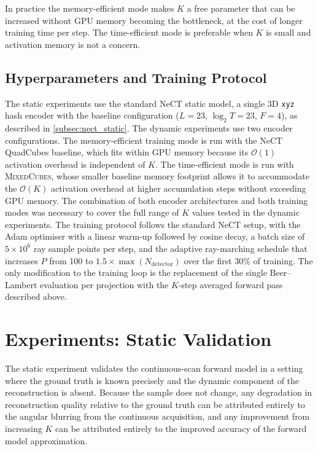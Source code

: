 \documentclass[12pt, a4paper, twoside]{report}
\newcommand{\MixedCubes}{\textsc{MixedCubes}}
\begin{document}
In practice the memory-efficient mode makes $K$ a free parameter that can be increased without GPU memory becoming the bottleneck, at the cost of longer training time per step. The time-efficient mode is preferable when $K$ is small and activation memory is not a concern.


\subsection{Hyperparameters and Training Protocol}
\label{subsec:cont_training}

The static experiments use the standard NeCT static model, a single 3D \texttt{xyz} hash encoder with the baseline configuration ($L = 23$, $\log_2 T = 23$, $F = 4$), as described in \cref{subsec:nect_static}. The dynamic experiments use two encoder configurations. The memory-efficient training mode is run with the NeCT QuadCubes baseline, which fits within GPU memory because its $\mathcal{O}(1)$ activation overhead is independent of $K$. The time-efficient mode is run with \MixedCubes{}, whose smaller baseline memory footprint allows it to accommodate the $\mathcal{O}(K)$ activation overhead at higher accumulation steps without exceeding GPU memory. The combination of both encoder architectures and both training modes was necessary to cover the full range of $K$ values tested in the dynamic experiments. The training protocol follows the standard NeCT setup, with the Adam optimiser with a linear warm-up followed by cosine decay, a batch size of $5 \times 10^6$ ray sample points per step, and the adaptive ray-marching schedule that increases $P$ from 100 to $1.5 \times \max(N_\mathrm{detector})$ over the first 30\% of training. The only modification to the training loop is the replacement of the single Beer--Lambert evaluation per projection with the $K$-step averaged forward pass described above.


\section{Experiments: Static Validation}
\label{sec:cont_static}

The static experiment validates the continuous-scan forward model in a setting where the ground truth is known precisely and the dynamic component of the reconstruction is absent. Because the sample does not change, any degradation in reconstruction quality relative to the ground truth can be attributed entirely to the angular blurring from the continuous acquisition, and any improvement from increasing $K$ can be attributed entirely to the improved accuracy of the forward model approximation.
\end{document}
